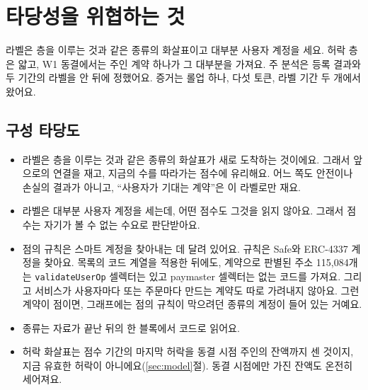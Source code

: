 \section{타당성을 위협하는 것}
\label{sec:threats}

\begin{yoji}
라벨은 층을 이루는 것과 같은 종류의 화살표이고 대부분 사용자 계정을 세요. 허락 층은 얇고, W1 동결에서는 주인 계약 하나가 그 대부분을 가져요. 주 분석은 등록 결과와 두 기간의 라벨을 안 뒤에 정했어요. 증거는 롤업 하나, 다섯 토큰, 라벨 기간 두 개에서 왔어요.
\end{yoji}

\subsection{구성 타당도}

\begin{itemize}
\item 라벨은 층을 이루는 것과 같은 종류의 화살표가 새로 도착하는 것이에요. 그래서 앞으로의 연결을 재고, 지금의 수를 따라가는 점수에 유리해요. 어느 쪽도 안전이나 손실의 결과가 아니고, “사용자가 기대는 계약”은 이 라벨로만 재요.
\item 라벨은 대부분 사용자 계정을 세는데, 어떤 점수도 그것을 읽지 않아요. 그래서 점수는 자기가 볼 수 없는 수요로 판단받아요.
\item 점의 규칙은 스마트 계정을 찾아내는 데 달려 있어요. 규칙은 Safe와 ERC-4337 계정을 찾아요. 목록의 코드 계열을 적용한 뒤에도, 계약으로 판별된 주소 115,084개는 \texttt{validateUserOp} 셀렉터는 있고 paymaster 셀렉터는 없는 코드를 가져요. 그리고 서비스가 사용자마다 또는 주문마다 만드는 계약도 따로 가려내지 않아요. 그런 계약이 점이면, 그래프에는 점의 규칙이 막으려던 종류의 계정이 들어 있는 거예요.
\item 종류는 자료가 끝난 뒤의 한 블록에서 코드로 읽어요.
\item 허락 화살표는 점수 기간의 마지막 허락을 동결 시점 주인의 잔액까지 센 것이지, 지금 유효한 허락이 아니에요(\ref{sec:model}절). 동결 시점에만 가진 잔액도 온전히 세어져요.
\end{itemize}

